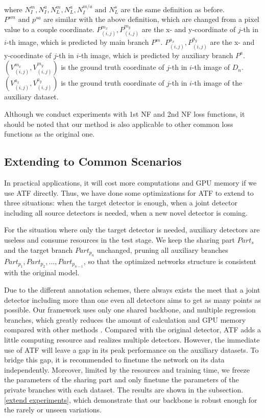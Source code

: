 \documentclass[journal,transmag]{IEEEtran}
\begin{document}
where $N_I^m, N_I^a, N_L^m, N_L^a, N_{I}^{m/a} \text{ and } N_L^s$ are the same definition as before.
$P^{sm} \text{ and } p^{sa}$ are similar with the above definition, which are changed from a pixel value to a couple coordinate.
$P_{(i,j)}^{m_x},P_{(i,j)}^{m_y}$ are the x- and y-coordinate of $j$-th in $i$-th image, which is predicted by main branch $P^m$.
$P_{(i,j)}^{a_x},P_{(i,j)}^{a_y}$ are the x- and y-coordinate of $j$-th in $i$-th image, which is predicted by auxiliary branch $P^a$.
$(V_{(i,j)}^{m_x},V_{(i,j)}^{m_y})$ is the ground truth coordinate of $j$-th in $i$-th image of $D_n$.
$(V_{(i,j)}^{a_x},V_{(i,j)}^{a_y})$ is the ground truth coordinate of $j$-th in $i$-th image of the auxiliary dataset.

Although we conduct experiments with 1st NF and 2nd NF loss functions, it should be noted that our method is also applicable to other common loss functions as the original one.


\subsection{Extending to Common Scenarios}
\label{extend common}
In practical applications, it will cost more computations and GPU memory if we use ATF directly.
Thus, we have done some optimizations for ATF to extend to three situations: when the target detector is enough, when a joint detector including all source detectors is needed, when a new novel detector is coming.

For the situation where only the target detector is needed, auxiliary detectors are useless and consume resources in the test stage.
We keep the sharing part $Part_s$ and the target branch $Part_{p_n}$ unchanged, pruning all auxiliary branches $Part_{p_1},Part_{p_2},\dots,Part_{p_{n-1}}$, so that the optimized networks structure is consistent with the original model. 

Due to the different annotation schemes, there always exists the meet that a joint detector including more than one even all detectors aims to get as many points as possible. 
Our framework uses only one shared backbone, and multiple regression branches, which greatly reduces the amount of calculation and GPU memory compared with other methods \cite{smith2014collaborative,zhu2014transferring}.
Compared with the original detector, ATF adds a little computing resource and realizes multiple detectors.
However, the immediate use of ATF will leave a gap in its peak performance on the auxiliary datasets. 
To bridge this gap, it is recommended to finetune the network on its data independently.
Moreover, limited by the resources and training time, we freeze the parameters of the sharing part and only finetune the parameters of the private branches with each dataset.
The results are shown in the subsection.\ref{extend experiments}, which demonstrate that our backbone is robust enough for the rarely or unseen variations.
\end{document}
